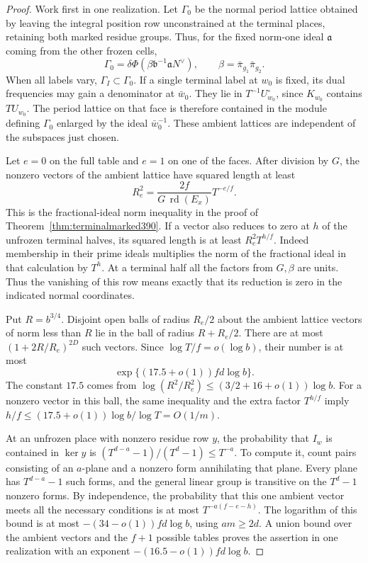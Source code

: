 \documentclass[a4paper,11pt]{article}
\theoremstyle{definition}
\theoremstyle{remark}
\numberwithin{equation}{section}
\begin{document}
\begin{proof}
Work first in one realization. Let \(\Gamma_0\) be the normal
period lattice obtained by leaving the integral position row
unconstrained at the terminal places, retaining both marked
residue groups. Thus, for the fixed norm-one ideal
\(\mathfrak a\) coming from the other frozen cells,
\[
     \Gamma_0=\delta\Phi(\beta\mathfrak b^{-1}\mathfrak a N^\vee),
              \qquad \beta=\bar\pi_{g_1}\bar\pi_{g_2}.
\]
When all labels vary, \(\Gamma_I\subset\Gamma_0\). If a
single terminal label at \(w_0\) is fixed, its dual
frequencies may gain a denominator at \(\bar w_0\). They
lie in \(T^{-1}U_{w_0}^\circ\), since \(K_{w_0}\) contains
\(TU_{w_0}\). The period lattice on that face is therefore
contained in the module defining \(\Gamma_0\) enlarged by
the ideal \(\bar w_0^{-1}\). These ambient lattices are
independent of the subspaces just chosen.

Let \(e=0\) on the full table and \(e=1\) on one of the
faces. After division by \(G\), the nonzero vectors of the
ambient lattice have squared length at least
\[
    R_e^2=\frac{2f}{G\,\operatorname{rd}(E_x)}T^{-e/f}.
\]
This is the fractional-ideal norm inequality in the proof
of Theorem~\ref{thm:terminalmarked390}. If a vector also
reduces to zero at \(h\) of the unfrozen terminal halves,
its squared length is at least \(R_e^2T^{h/f}\). Indeed
membership in their prime ideals multiplies the norm of the
fractional ideal in that calculation by \(T^h\).
At a terminal half all the factors from \(G,\beta\) are units.
Thus the vanishing of this row means exactly that its
reduction is zero in the indicated normal coordinates.

Put \(R=b^{3/4}\). Disjoint open balls of radius \(R_e/2\)
about the ambient lattice vectors of norm less than \(R\)
lie in the ball of radius \(R+R_e/2\). There are at most
\((1+2R/R_e)^{2D}\) such vectors. Since
\(\log T/f=o(\log b)\), their number is at most
\[
                \exp\{(17.5+o(1))fd\log b\}.
\]
The constant \(17.5\) comes from
\(\log(R^2/R_e^2)\le(3/2+16+o(1))\log b\).
For a nonzero vector in this ball, the same inequality and
the extra factor \(T^{h/f}\) imply
\(h/f\le(17.5+o(1))\log b/\log T=O(1/m)\).

At an unfrozen place with nonzero residue row \(y\), the
probability that \(I_w\) is contained in \(\ker y\) is
\((T^{d-a}-1)/(T^d-1)\le T^{-a}\). To compute it, count
pairs consisting of an \(a\)-plane and a nonzero form
annihilating that plane. Every plane has \(T^{d-a}-1\)
such forms, and the general linear group is transitive on
the \(T^d-1\) nonzero forms. By independence, the probability
that this one ambient vector meets all the necessary conditions
is at most \(T^{-a(f-e-h)}\). The logarithm of this bound is
at most \(-(34-o(1))fd\log b\), using \(am\ge2d\). A union
bound over the ambient vectors and the \(f+1\) possible
tables proves the assertion in one realization with an
exponent \(-(16.5-o(1))fd\log b\).


\end{proof}
\end{document}
